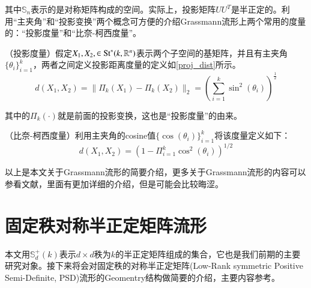 其中$\mathbb{S}_n$表示的是对称矩阵构成的空间。实际上，投影矩阵$UU^{T}$是半正定的。利用“主夹角”和“投影变换”两个概念可方便的介绍Grassmann流形上两个常用的度量的：“投影度量”和“比奈-柯西度量”。
\begin{definition}
\label{Projection_metric}
{\heiti （投影度量）}假定$X_1,X_2,\in {\rm St}^{*}(k,\mathbb{R}^{n})$表示两个子空间的基矩阵，并且有主夹角$\{\theta_i\}_{i=1}^{k}$，两者之间定义投影距离度量的定义如\ref{proj_dist}所示。
\begin{equation}
\label{proj_dist}
d(X_1,X_2)=\|\Pi_k(X_1)-\Pi_k(X_2)\|_{2}=\left(\sum_{i=1}^{k}\sin^{2}(\theta_i)\right)^{\frac{1}{2}}
\end{equation}
\end{definition}
其中的$\Pi_k(\cdot)$就是前面的投影变换，这也是“投影度量”的由来。
\begin{definition}
\label{BC_metric}
{\heiti （比奈-柯西度量）}利用主夹角的cosine值$\{\cos(\theta_i)\}_{i=1}^{k}$将该度量定义如下：
\begin{equation}
d(X_1,X_2)=\left(1-\Pi_{i=1}^{k}\cos^{2}(\theta_i)\right)^{1/2}
\end{equation}
\end{definition}
以上是本文关于Grassmann流形的简要介绍，更多关于Grassmann流形的内容可以参看文献\cite{Grassmann}，里面有更加详细的介绍，但是可能会比较晦涩。
\section{固定秩对称半正定矩阵流形}
\label{sec:Fixed-rank-PSD}
本文用$\mathbb{S}_{d}^{+}(k)$表示$d \times d$秩为$k$的半正定矩阵组成的集合，它也是我们前期的主要研究对象。接下来将会对固定秩的对称半正定矩阵(Low-Rank symmetric Positive Semi-Definite, PSD)流形的Geomentry结构做简要的介绍，主要内容参考\cite{PSD_Riemannian}。

